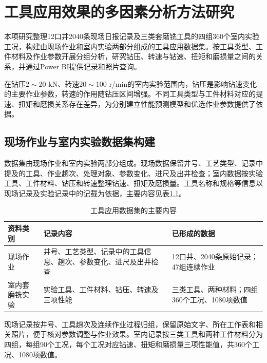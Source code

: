 \chapter{工具应用效果的多因素分析方法研究}
\label{chap:r46-4}

本项研究整理12口井2040条现场日报记录及三类套磨铣工具的四组360个室内实验工况，构建由现场作业和室内实验两部分组成的工具应用数据集。按工具类型、工件材料及作业参数开展分组分析，研究钻压、转速与钻速、扭矩和磨损量之间的关系，并通过Power BI提供记录和照片查询。

在钻压$2\sim20$ kN、转速$20\sim100$ r/min的室内实验范围内，钻压是影响钻速变化的主要作业参数，转速的作用随钻压区间增强。不同工具类型与工件材料对应的提速、扭矩和磨损关系存在差异，为分别建立性能预测模型和优选作业参数提供了依据。

\section{现场作业与室内实验数据集构建}
\label{sec:r46-4.1}

数据集由现场作业和室内实验两部分组成。现场数据保留井号、工艺类型、记录中提及的工具、作业趟次、处理对象、参数变化、进尺及出井检查；室内数据按实验工具、工件材料、钻压和转速整理钻速、扭矩及磨损量。工具名称和规格等信息以现场记录及实验记录中的记载为依据，主要内容见表\ref{tab:r46-4-1}。

\begin{table}[H]
\centering
{}
\fontsize{12}{15}\selectfont
\setlength{\tabcolsep}{3pt}
\renewcommand{\arraystretch}{1.5}
\caption{工具应用数据集的主要内容}\label{tab:r46-4-1}
\begin{tabular}{>{\centering\arraybackslash}m{0.204792\dimexpr\linewidth-6\tabcolsep-4\arrayrulewidth\relax}>{\centering\arraybackslash}m{0.433422\dimexpr\linewidth-6\tabcolsep-4\arrayrulewidth\relax}>{\centering\arraybackslash}m{0.361787\dimexpr\linewidth-6\tabcolsep-4\arrayrulewidth\relax}}
\toprule
 资料类别 & 记录内容 & 已形成的数据 \\ \midrule
现场作业 & 井号、工艺类型、记录中的工具信息、趟次、参数变化、进尺及出井检查 & 12口井、2040条原始记录；47组连续作业 \\ 
室内套磨铣实验 & 实验工具、工件材料、钻压、转速及三项性能 & 三类工具、两种材料；四组360个工况、1080项数值 \\ \bottomrule
\end{tabular}
\end{table}

现场记录按井号、工具趟次及连续作业过程归组，保留原始文字、所在工作表和相关照片，便于核对参数调整与作业效果。室内记录按三类工具和两种工件材料分为四组，每组90个工况，每个工况对应钻速、扭矩和磨损量三项性能值，共360个工况、1080项数值。


